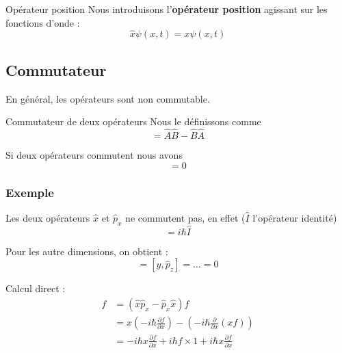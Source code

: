 \begin{Definition}[colbacktitle=red!75!black]{Opérateur position}{}
Nous introduisons l'\textbf{opérateur position} agissant sur les fonctions d'onde : 
\begin{equation}
  \hat{x} \psi (x,t) = x \psi(x,t)
\end{equation}
\end{Definition}

\subsection{Commutateur} %
\label{sub:Commutateur}

En général, les opérateurs sont non commutable. 
\begin{Definition}[colbacktitle=red!75!black]{Commutateur de deux opérateurs}{}
Nous le définissons comme 
\begin{equation}
  [ \hat{A},\hat{B}] = \hat{A} \hat{B} - \hat{B} \hat{A}
\end{equation}
\end{Definition}


Si deux opérateurs commutent nous avons 
\begin{equation}
  [ \hat{A}, \hat{B}] = 0
\end{equation}

\subsubsection{Exemple} %
\label{sec:Exemple}

Les deux opérateurs $\hat{x}$ et $\hat{p}_x$ ne commutent pas, en effet ($\hat{I}$ l'opérateur identité)
\begin{equation}
  [\hat{x}, \hat{p}_x] = i \hbar \hat{I}
\end{equation}

Pour les autre dimensions, on obtient :
\begin{equation}
  [ \hat{x}, \hat{p}_y] = [\hat{y}, \hat{p}_z] = \dots = 0
\end{equation}

\begin{myproof}{}{} Calcul direct : 
\begin{align}
  [\hat{x}, \hat{p}_x]f &= (\hat{x}\hat{p}_x - \hat{p}_x \hat{x}) f \\ 
                        &= x \left( -i \hbar \frac{\partial f}{\partial x}  \right) - \left(- i \hbar \frac{\partial }{\partial x} (xf)\right) \\ 
                        &= -i \hbar x \frac{\partial f}{\partial x}  + i \hbar f \times 1 + i \hbar x \frac{\partial f}{\partial x}
\end{align}
\end{myproof}


